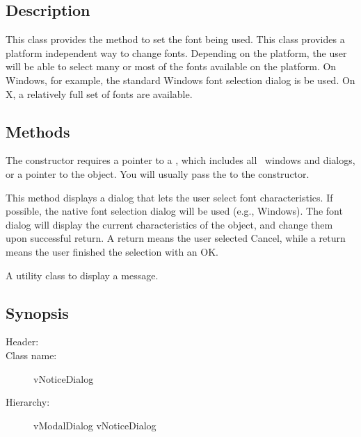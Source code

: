 \subsection* {Description}

This class provides the  method to set
the font being used. This class provides a platform
independent way to change fonts. Depending on the platform,
the user will be able to select many or most of the fonts
available on the platform. On Windows, for example, the standard
Windows font selection dialog is be used. On X, a relatively
full set of fonts are available.

\subsection* {Methods}


The  constructor requires a pointer to a
, which includes all \V\ windows and dialogs,
or a pointer to the  object.
You will usually pass the  to the constructor.


This method displays a dialog that lets the user select font
characteristics. If possible, the native font selection dialog
will be used (e.g., Windows). The font dialog will display the
current characteristics of the  object, and change
them upon successful return. A  return means the user
selected Cancel, while a  return means the user
finished the selection with an OK.



A utility class to display a message.

\subsection* {Synopsis}

\begin{description}
        \item [Header:] 
        \item [Class name:] vNoticeDialog
        \item [Hierarchy:] vModalDialog \rta vNoticeDialog
\end{description}

